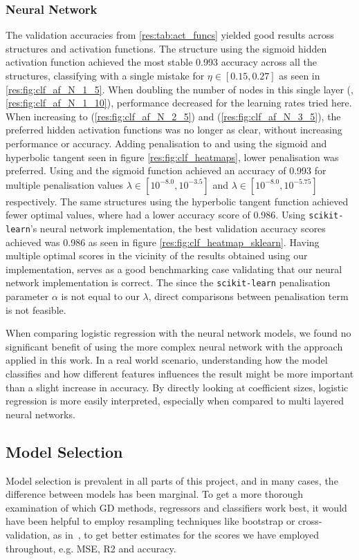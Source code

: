     \subsubsection{Neural Network}
        The validation accuracies from \cref{res:tab:act_funcs} yielded good results across structures and activation functions. The  structure using the sigmoid hidden activation function achieved the most stable 0.993 accuracy across all the structures, classifying with a single mistake for $\eta \in [0.15, 0.27]$ as seen in \cref{res:fig:clf_af_N_1_5}. When doubling the number of nodes in this single layer (, \cref{res:fig:clf_af_N_1_10}), performance decreased for the learning rates tried here. When increasing to  (\cref{res:fig:clf_af_N_2_5}) and  (\cref{res:fig:clf_af_N_3_5}), the preferred hidden activation functions was no longer as clear, without increasing performance or accuracy. Adding penalisation to  and  using the sigmoid and hyperbolic tangent seen in figure \cref{res:fig:clf_heatmaps}, lower penalisation was preferred. Using  and  the sigmoid function achieved an accuracy of 0.993 for multiple penalisation values  $\lambda \in [10^{-8.0}, 10^{-3.5}]$ and $\lambda \in [10^{-8.0}, 10^{-5.75}]$ respectively. The same structures using the hyperbolic tangent function achieved fewer optimal values, where  had a lower accuracy score of 0.986. Using \verb|scikit-learn|'s neural network implementation, the best validation accuracy scores achieved was 0.986 as seen in figure \cref{res:fig:clf_heatmap_sklearn}. Having multiple optimal scores in the vicinity of the results obtained using our implementation, serves as a good benchmarking case validating that our neural network implementation is correct. The since the \verb|scikit-learn| penalisation parameter $\alpha$ is not equal to our $\lambda$, direct comparisons between penalisation term is not feasible.


        When comparing logistic regression with the neural network models, we found no significant benefit of using the more complex neural network with the approach applied in this work. In a real world scenario, understanding how the model classifies and how different features influences the result might be more important than a slight increase in accuracy. By directly looking at coefficient sizes, logistic regression is more easily interpreted, especially when compared to multi layered neural networks.  
        
        
\subsection{Model Selection}
    Model selection is prevalent in all parts of this project, and in many cases, the difference between models has been marginal. To get a more thorough examination of which GD methods, regressors and classifiers work best, it would have been helpful to employ resampling techniques like bootstrap or cross-validation, as in~\citep{Project1}, to get better estimates for the scores we have employed throughout, e.g. MSE, R2 and accuracy.